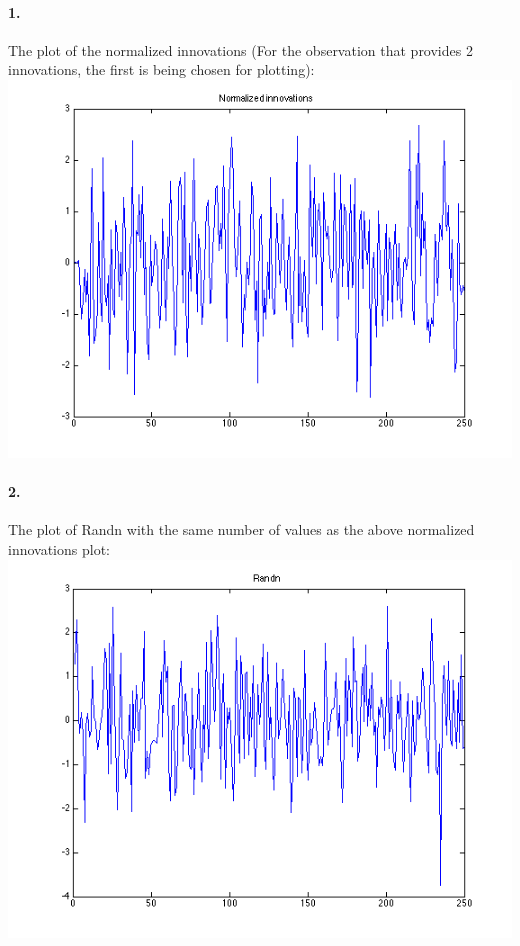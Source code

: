 \documentclass[a4paper]{article}
\begin{document}
\paragraph{1. } The plot of the normalized innovations (For the observation that provides 2 innovations, the first is being chosen for plotting):\\
\includegraphics[scale=.75]{normalized_innovations.png}
\paragraph{2. } The plot of Randn with the same number of values as the above normalized innovations plot:\\
\includegraphics[scale=.75]{randn.png}\\
\end{document}
